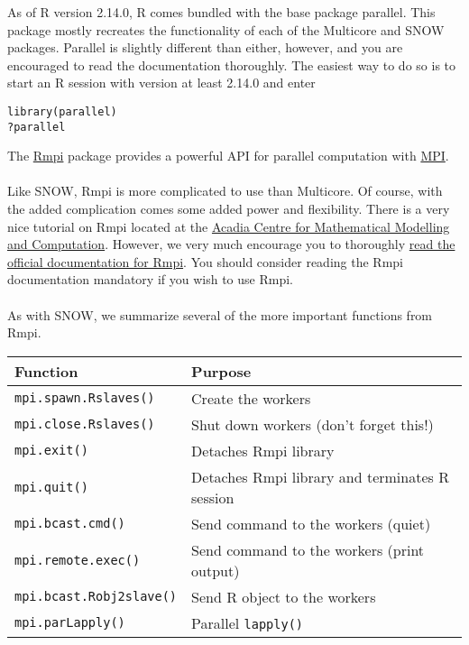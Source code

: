 As of R version 2.14.0, R comes bundled with the base package parallel.  This package mostly recreates the functionality of each of the Multicore and SNOW packages.  Parallel is slightly different than either, however, and you are encouraged to read the documentation thoroughly.  The easiest way to do so is to start an R session with version at least 2.14.0 and enter
\begin{lstlisting}[language=rr]
library(parallel)
?parallel
\end{lstlisting}


The \href{http://cran.r-project.org/web/packages/Rmpi/index.html}{Rmpi} package provides a powerful API for parallel computation with \href{https://en.wikipedia.org/wiki/Message_Passing_Interface}{MPI}.\\\\
%
Like SNOW, Rmpi is more complicated to use than Multicore.  Of course, with the added complication comes some added power and flexibility.  There is a very nice tutorial on Rmpi located at the \href{http://math.acadiau.ca/ACMMaC/Rmpi/}{Acadia Centre for Mathematical Modelling and Computation}.  However, we very much encourage you to thoroughly \href{http://cran.r-project.org/web/packages/Rmpi/Rmpi.pdf}{read the official documentation for Rmpi}.  You should consider reading the Rmpi documentation mandatory if you wish to use Rmpi.\\\\
%
As with SNOW, we summarize several of the more important functions from Rmpi.
\begin{table}[h]
 \centering
 \begin{tabular}{ll}\hline
  Function & Purpose\\\hline
  \texttt{mpi.spawn.Rslaves()} & Create the workers\\
  \texttt{mpi.close.Rslaves()} & Shut down workers (don't forget this!)\\
  \texttt{mpi.exit()} & Detaches Rmpi library\\
  \texttt{mpi.quit()} & Detaches Rmpi library and terminates R session\\
  \texttt{mpi.bcast.cmd()} & Send command to the workers (quiet)\\
  \texttt{mpi.remote.exec()} & Send command to the workers (print output)\\
  \texttt{mpi.bcast.Robj2slave()} & Send R object to the workers\\
  \texttt{mpi.parLapply()} & Parallel \texttt{lapply()}\\\hline
 \end{tabular}
\end{table}

